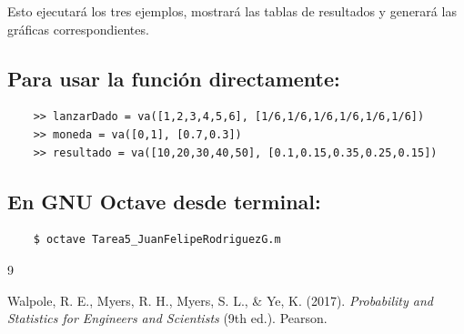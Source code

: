 \documentclass{article}
\begin{document}
    Esto ejecutará los tres ejemplos, mostrará las tablas de resultados y generará las gráficas correspondientes.
    
    \subsection*{Para usar la función directamente:}
    \begin{verbatim}
    >> lanzarDado = va([1,2,3,4,5,6], [1/6,1/6,1/6,1/6,1/6,1/6])
    >> moneda = va([0,1], [0.7,0.3])
    >> resultado = va([10,20,30,40,50], [0.1,0.15,0.35,0.25,0.15])
    \end{verbatim}
    
    \subsection*{En GNU Octave desde terminal:}
    \begin{verbatim}
    $ octave Tarea5_JuanFelipeRodriguezG.m
    \end{verbatim}
    
    \begin{thebibliography}{9}
    
    Walpole, R. E., Myers, R. H., Myers, S. L., \& Ye, K. (2017).
    \textit{Probability and Statistics for Engineers and Scientists} (9th ed.).
    Pearson.
    
    \end{thebibliography}
    
\end{document}
